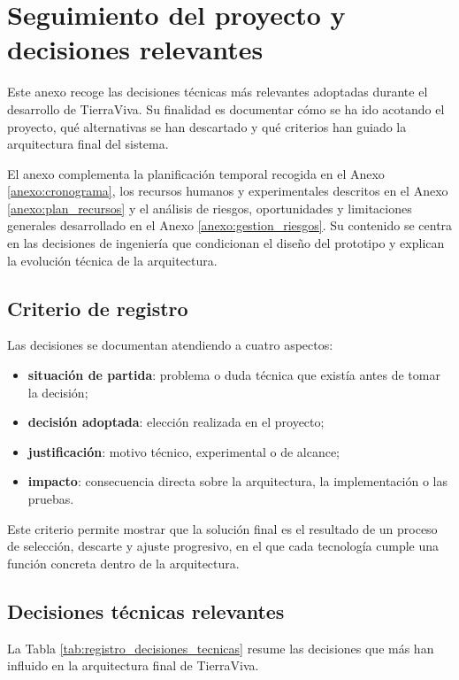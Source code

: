 \chapter{Seguimiento del proyecto y decisiones relevantes}
\label{anexo:seguimiento_decisiones}

Este anexo recoge las decisiones técnicas más relevantes adoptadas durante el desarrollo de TierraViva. Su finalidad es documentar cómo se ha ido acotando el proyecto, qué alternativas se han descartado y qué criterios han guiado la arquitectura final del sistema.

El anexo complementa la planificación temporal recogida en el Anexo \ref{anexo:cronograma}, los recursos humanos y experimentales descritos en el Anexo \ref{anexo:plan_recursos} y el análisis de riesgos, oportunidades y limitaciones generales desarrollado en el Anexo \ref{anexo:gestion_riesgos}. Su contenido se centra en las decisiones de ingeniería que condicionan el diseño del prototipo y explican la evolución técnica de la arquitectura.

\section{Criterio de registro}

Las decisiones se documentan atendiendo a cuatro aspectos:

\begin{itemize}
    \item \textbf{situación de partida}: problema o duda técnica que existía antes de tomar la decisión;
    \item \textbf{decisión adoptada}: elección realizada en el proyecto;
    \item \textbf{justificación}: motivo técnico, experimental o de alcance;
    \item \textbf{impacto}: consecuencia directa sobre la arquitectura, la implementación o las pruebas.
\end{itemize}

Este criterio permite mostrar que la solución final es el resultado de un proceso de selección, descarte y ajuste progresivo, en el que cada tecnología cumple una función concreta dentro de la arquitectura.

\section{Decisiones técnicas relevantes}

La Tabla \ref{tab:registro_decisiones_tecnicas} resume las decisiones que más han influido en la arquitectura final de TierraViva.

